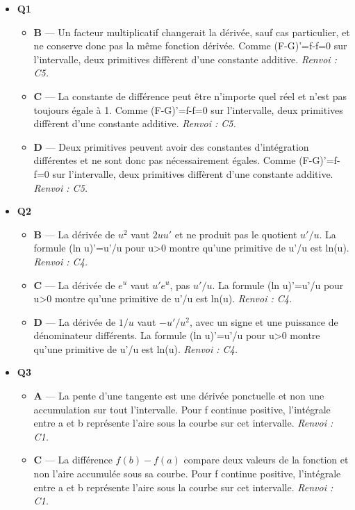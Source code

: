 \begin{itemize}
  \item \textbf{Q1}
  \begin{itemize}
    \item \textbf{B} — Un facteur multiplicatif changerait la dérivée, sauf cas particulier, et ne conserve donc pas la même fonction dérivée. Comme (F-G)'=f-f=0 sur l'intervalle, deux primitives diffèrent d'une constante additive. \emph{Renvoi : C5.}
    \item \textbf{C} — La constante de différence peut être n'importe quel réel et n'est pas toujours égale à 1. Comme (F-G)'=f-f=0 sur l'intervalle, deux primitives diffèrent d'une constante additive. \emph{Renvoi : C5.}
    \item \textbf{D} — Deux primitives peuvent avoir des constantes d'intégration différentes et ne sont donc pas nécessairement égales. Comme (F-G)'=f-f=0 sur l'intervalle, deux primitives diffèrent d'une constante additive. \emph{Renvoi : C5.}
  \end{itemize}
  \item \textbf{Q2}
  \begin{itemize}
    \item \textbf{B} — La dérivée de $u^2$ vaut $2uu'$ et ne produit pas le quotient $u'/u$. La formule (ln u)'=u'/u pour u>0 montre qu'une primitive de u'/u est ln(u). \emph{Renvoi : C4.}
    \item \textbf{C} — La dérivée de $e^u$ vaut $u'e^u$, pas $u'/u$. La formule (ln u)'=u'/u pour u>0 montre qu'une primitive de u'/u est ln(u). \emph{Renvoi : C4.}
    \item \textbf{D} — La dérivée de $1/u$ vaut $-u'/u^2$, avec un signe et une puissance de dénominateur différents. La formule (ln u)'=u'/u pour u>0 montre qu'une primitive de u'/u est ln(u). \emph{Renvoi : C4.}
  \end{itemize}
  \item \textbf{Q3}
  \begin{itemize}
    \item \textbf{A} — La pente d'une tangente est une dérivée ponctuelle et non une accumulation sur tout l'intervalle. Pour f continue positive, l'intégrale entre a et b représente l'aire sous la courbe sur cet intervalle. \emph{Renvoi : C1.}
    \item \textbf{C} — La différence $f(b)-f(a)$ compare deux valeurs de la fonction et non l'aire accumulée sous sa courbe. Pour f continue positive, l'intégrale entre a et b représente l'aire sous la courbe sur cet intervalle. \emph{Renvoi : C1.}

\end{itemize}
\end{itemize}
